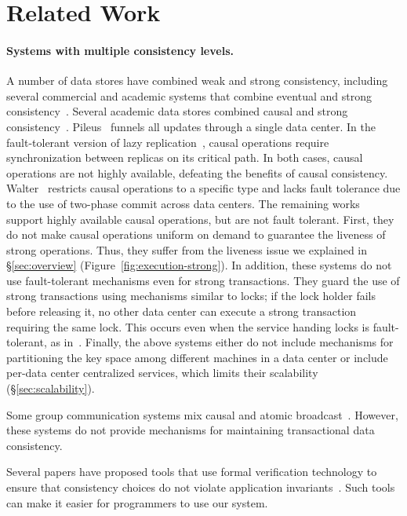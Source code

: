 \section{Related Work}
\label{sec:related}

\paragraph{Systems with multiple consistency levels.}
A number of data stores have combined weak and strong consistency,
including several commercial and academic systems that combine eventual and strong
consistency~\cite{cosmosdb,documentdb,pileus,google,dynamodb,cassandra,
tapir}.
Several academic data stores combined causal and strong consistency~\cite{lazy, red-blue, valter, por,
  walter, pileus}. Pileus~\cite{pileus} funnels all updates through a single
data center. In the fault-tolerant version of lazy
replication~\cite{lazy}, causal operations require synchronization
between replicas on its critical path. In both cases, causal
operations are not highly available, defeating the benefits of
causal consistency. Walter~\cite{walter} restricts causal operations to
a specific type and lacks fault tolerance due to the use
of two-phase commit across data centers.
The remaining works~\cite{red-blue, valter, por} support highly available causal
operations, but are not fault tolerant. First, they do not make causal
operations uniform on demand to guarantee the liveness of strong
operations. Thus, they suffer from the liveness issue we explained
in \S\ref{sec:overview} (Figure~\ref{fig:execution-strong}). In addition, these
systems do not use fault-tolerant mechanisms even for strong transactions.
They guard the use of strong transactions using mechanisms similar to locks;
if the lock holder fails before releasing it, no other data center can execute a
strong transaction requiring the same lock. This occurs even
when the service handing locks is fault-tolerant, as in~\cite{por}.
Finally, the above systems either do not include mechanisms for partitioning the
key space among different machines in a data center or include
per-data center centralized services, which
limits their scalability (\S\ref{sec:scalability}).




Some group communication systems mix causal and atomic
broadcast~\cite{isis,horus}. However, these systems do not provide mechanisms
for maintaining transactional data consistency.



Several papers have proposed tools that use formal verification technology
to ensure that consistency choices do not violate application
invariants~\cite{valter,cheng-tool,cise-tool,cise-popl16,suresh,sreeja}. Such
tools can make it easier for programmers to use our system.







